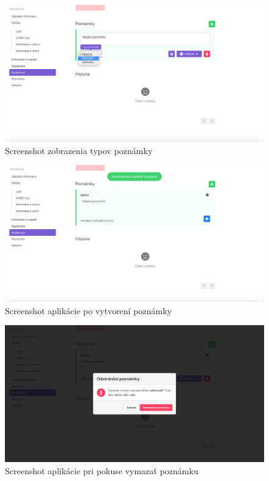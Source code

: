 \begin{figure}[H]
	\includegraphics[width=1.0\textwidth]{media/priloha/zviera/poznamka/3.png}
	\caption{Screenshot zobrazenia typov poznámky}
\end{figure}

\vspace*{\fill}

\begin{figure}[H]
	\includegraphics[width=1.0\textwidth]{media/priloha/zviera/poznamka/4.png}
	\caption{Screenshot aplikácie po vytvorení poznámky}
\end{figure}

\begin{figure}[H]
	\includegraphics[width=1.0\textwidth]{media/priloha/zviera/poznamka/5.png}
	\caption{Screenshot aplikácie pri pokuse vymazať poznámku}
\end{figure}

